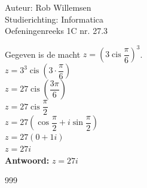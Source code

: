 \documentclass[a4paper]{article}
\begin{document}
\noindent \large Auteur: Rob Willemsen \\
\noindent \large Studierichting: Informatica\\
\noindent \large Oefeningenreeks 1C nr. 27.3\\

\medskip
\normalsize

Gegeven is de macht $z = \left(3 \operatorname{cis} \dfrac{\pi}{6}\right)^3$. \\

$z = 3^3 \operatorname{cis} \left(3 \cdot \dfrac{\pi}{6}\right)$ \\

$z = 27 \operatorname{cis} \left(\dfrac{3\pi}{6}\right)$ \\

$z = 27 \operatorname{cis} \dfrac{\pi}{2}$ \\

$z = 27 \left(\cos \dfrac{\pi}{2} + i \sin \dfrac{\pi}{2}\right)$ \\

$z = 27 (0 + 1i)$ \\

$z = 27i$ \\

\textbf{Antwoord:} $z = 27i$ \\

\begin{thebibliography}{999}
\end{thebibliography}
\end{document}
